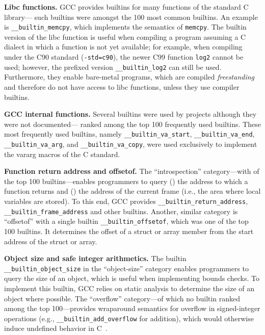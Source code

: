 \documentclass[sigconf,screen]{acmart}
\renewcommand{\paragraph}[1]{\textbf{#1}}
\newcommand\code[1]{\texttt{#1}}
\newcommand{\RNum}[1]{\uppercase\expandafter{\romannumeral #1\relax}}
\begin{document}
\paragraph{Libc functions.}
GCC provides builtins for many functions of the standard C library---\topOtherLibcBuiltins{} such builtins were amongst the 100 most common builtins.
An example is \code{\_\_builtin\_memcpy}, which implements the semantics of \code{memcpy}.
The builtin version of the libc function is useful when compiling a program assuming a C dialect in which a function is not yet available; for example, when compiling under the C90 standard (\code{-std=c90}), the newer C99 function \code{log2} cannot be used; however, the prefixed version \code{\_\_builtin\_log2} can still be used.
Furthermore, they enable bare-metal programs, which are compiled \emph{freestanding} and therefore do not have access to libc functions, unless they use compiler builtins.

\paragraph{GCC internal functions.}
Several builtins were used by projects although they were not documented---\topInternalBuiltins{} ranked among the top 100 frequently used builtins.
These most frequently used builtins, namely \code{\_\_builtin\_va\_start}, \code{\_\_builtin\_va\_end}, \code{\_\_builtin\_va\_arg}, and \code{\_\_builtin\_va\_copy}, were used exclusively to implement the vararg macros of the C standard.

\paragraph{Function return address and offsetof.}
The ``introspection'' category---with \topAddressBuiltins{} of the top 100 builtins---enables programmers to query (\RNum{1}) the address to which a function returns and (\RNum{2}) the address of the current frame (i.e., the area where local variables are stored).
To this end, GCC provides \code{\_\_builtin\_return\_address}, \code{\_\_builtin\_frame\_address} and other builtins.
Another, similar category is ``offsetof'' with a single builtin \code{\_\_builtin\_offsetof}, which was one of the top 100 builtins.
It determines the offset of a struct or array member from the start address of the struct or array.

\paragraph{Object size and safe integer arithmetics.}
The builtin \code{\_\_builtin\_object\_size} in the ``object-size'' category enables programmers to query the size of an object, which is useful when implementing bounds checks.
To implement this builtin, GCC relies on static analysis to determine the size of an object where possible.
The ``overflow'' category---of which no builtin ranked among the top 100---provides wraparound semantics for overflow in signed-integer operations (e.g., \code{\_\_builtin\_add\_overflow} for addition), which would otherwise induce undefined behavior in C~\cite{intoverflow}.
\end{document}
